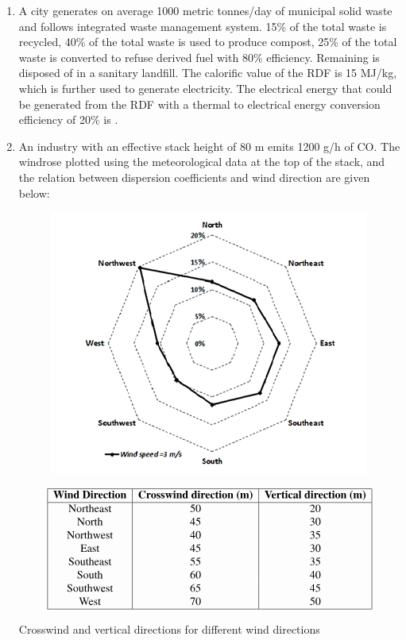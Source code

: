 \documentclass[journal,12pt,onecolumn]{IEEEtran}
\theoremstyle{remark}
\begin{document}
\begin{enumerate}
\item A city generates on average 1000 metric tonnes/day of municipal solid waste and follows integrated waste management system. 15\% of the total waste is recycled, 40\% of the total waste is used to produce compost, 25\% of the total waste is converted to refuse derived fuel  with 80\% efficiency. Remaining is disposed of in a sanitary landfill. The calorific value of the RDF is 15 MJ/kg, which is further used to generate electricity. The electrical energy that could be generated from the RDF with a thermal to electrical energy conversion efficiency of 20\% is \underline{\hspace{2cm}} .  
\hfill{}

\newpage

\item An industry with an effective stack height of 80 m emits 1200 g/h of CO. The windrose plotted using the meteorological data at the top of the stack, and the relation between dispersion coefficients and wind direction are given below:

\begin{center}
\begin{figure}[h]
    \centering
    \includegraphics[width=0.5\linewidth]{figs/img 6 (2).jpeg}
    \caption{}
    \label{fig:placeholder}
\end{figure}

\end{center}

\begin{table}[h!]
\centering
\[
\begin{array}{|c|c|c|}
\hline
\textbf{Wind Direction} & \textbf{Crosswind direction (m)} & \textbf{Vertical direction (m)} \\
\hline
\text{Northeast} & 50 & 20 \\
\text{North}     & 45 & 30 \\
\text{Northwest} & 40 & 35 \\
\text{East}      & 45 & 30 \\
\text{Southeast} & 55 & 35 \\
\text{South}     & 60 & 40 \\
\text{Southwest} & 65 & 45 \\
\text{West}      & 70 & 50 \\
\hline
\end{array}
\]
\caption{Crosswind and vertical directions for different wind directions}
\label{tab:wind}
\end{table}



\end{enumerate}
\end{document}
